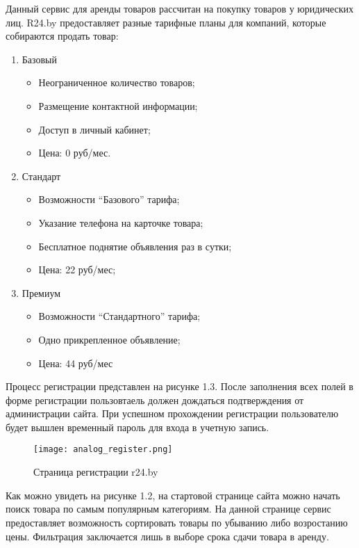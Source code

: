 Данный сервис для аренды товаров рассчитан на покупку товаров у юридических лиц.
R24.by предоставляет разные тарифные планы для компаний, которые собираются продать товар:
\begin{enumerate}[label=\arabic*)]
  \item Базовый
  \begin{itemize}
    \item Неограниченное количество товаров;
    \item Размещение контактной информации;
    \item Доступ в личный кабинет;
    \item Цена: 0 руб/мес.
  \end{itemize}
  \item Стандарт
  \begin{itemize}
    \item Возможности “Базового” тарифа;
    \item Указание телефона на карточке товара;
    \item Бесплатное поднятие объявления раз в сутки;
    \item Цена: 22 руб/мес;
  \end{itemize}
  \item Премиум
  \begin{itemize}
    \item Возможности “Стандартного” тарифа;
    \item Одно прикрепленное объявление;
    \item Цена: 44 руб/мес
  \end{itemize}
\end{enumerate}
\bigbreak

Процесс регистрации представлен на рисунке 1.3.
После заполнения всех полей в форме регистрации пользовтаель должен дождаться подтверждения от администрации сайта.
При успешном прохождении регистрации пользователю будет вышлен временный пароль для входа в учетную запись.

\begin{figure}[ht]
  \centering
      \texttt{[image: analog\_register.png]}
      \caption{Страница регистрации r24.by}
\end{figure}

Как можно увидеть на рисунке 1.2, на стартовой странице сайта можно начать поиск товара по самым популярным категориям.
На данной странице сервис предоставляет возможность сортировать товары по убыванию либо возростанию цены.
Фильтрация заключается лишь в выборе срока сдачи товара в аренду.

